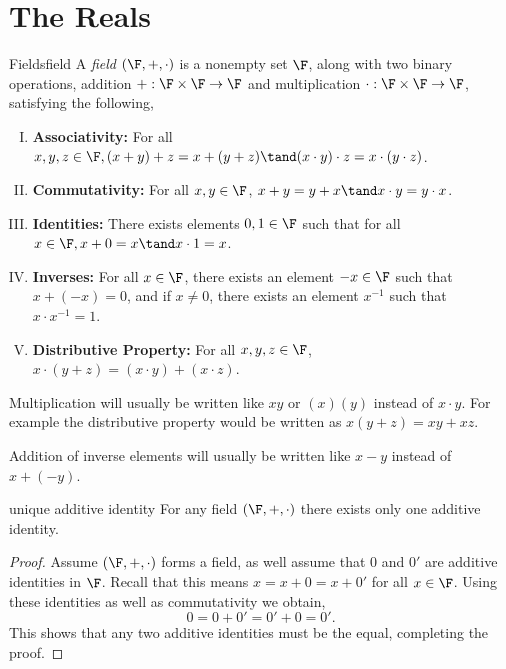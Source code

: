 \documentclass{report}
\begin{document}
\chapter{The Reals}

\begin{definition}{Fields}{field}
  A \emph{field} $\left(\F, +, \cdot\right)$ is a nonempty set $\F$, along with two binary operations,
  addition $+: \F \times \F \rightarrow \F$
  and multiplication $\cdot: \F \times \F \rightarrow \F$, satisfying the following,

  \begin{enumerate}[I.]
    \item \textbf{Associativity:} For all $x, y, z \in \F, (x + y) + z = x + (y + z) \tand (x \cdot y) \cdot z = x \cdot (y \cdot z)$.
    \item \textbf{Commutativity:} For all $x, y \in \F$, $x + y = y + x \tand x \cdot y = y \cdot x$.
    \item \textbf{Identities:} There exists elements $0, 1 \in \F$ such that for all $x \in \F, x + 0 = x \tand x \cdot 1 = x$.
    \item \textbf{Inverses:} For all $x \in \F$, there exists an element $-x \in \F$ such that $x + (-x) = 0$, and if $x \neq 0$, there exists an element $x^{-1}$ such that $x \cdot x^{-1} = 1$.
    \item \textbf{Distributive Property:} For all $x, y, z \in \F$, $x \cdot (y + z) = (x \cdot y) + (x \cdot z)$.
  \end{enumerate}
\end{definition}

\begin{notation}{}{}
  Multiplication will usually be written like $xy$ or $(x)(y)$ instead of $x \cdot y$.
  For example the distributive property would be written as $x(y + z) = xy + xz$.
\end{notation}

\begin{notation}{}{}
  Addition of inverse elements will usually be written like $x - y$ instead of $x + (-y)$.
\end{notation}

\begin{lemma}{unique additive identity}{}
  For any field $\left(\F, +, \cdot\right)$ there exists only one additive identity.
\end{lemma}

\begin{proof}
  Assume $\left(\F, +, \cdot\right)$ forms a field, as well assume that $0$ and $0'$ are additive identities in $\F$.
  Recall that this means $x = x + 0 = x + 0'$ for all $x \in \F$.
  Using these identities as well as commutativity we obtain,
  $$0 = 0 + 0' = 0' + 0 = 0'.$$
  This shows that any two additive identities must be the equal, completing the proof.
\end{proof}
\end{document}
